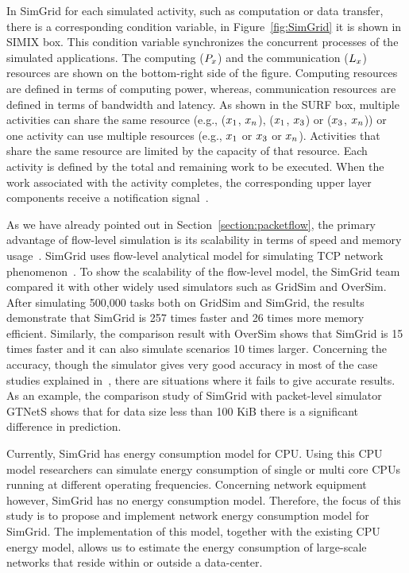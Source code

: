 In SimGrid for each simulated activity, such as computation or data transfer, there is a corresponding condition variable, in Figure~\ref{fig:SimGrid} it is shown in SIMIX box. This condition variable synchronizes the concurrent processes of the simulated applications. The computing (\($$P_{x}$$\)) and the communication (\($$L_{x}$$\)) resources are shown on the bottom-right side of the figure. Computing resources are defined in terms of computing power, whereas, communication resources are defined in terms of bandwidth and latency. As shown in the SURF box, multiple activities can share the same resource (e.g., (\($$x_{1}$$\), \($$x_{n}$$\)), (\($$x_{1}$$\), \($$x_{3}$$\)) or (\($$x_{3}$$\), \($$x_{n}$$\))) or one activity can use multiple resources (e.g., \($$x_{1}$$\) or \($$x_{3}$$\) or  \($$x_{n}$$\)). Activities that share the same resource are limited by the capacity of that resource. Each activity is defined by the total and remaining work to be executed. When the work associated with the activity completes, the corresponding upper layer components receive a notification signal~\cite{DBLP:journals/jpdc/CasanovaGLQS14}.

As we have already pointed out in Section~\ref{section:packetflow}, the primary advantage of flow-level simulation is its scalability in terms of speed and memory usage~\cite{DBLP:conf/ccgrid/QuinsonRT12}. SimGrid uses flow-level analytical model for simulating TCP network phenomenon~\cite{DBLP:journals/jpdc/CasanovaGLQS14}. To show the scalability of the flow-level model, the SimGrid team compared it with other widely used simulators such as GridSim and OverSim. After simulating 500,000 tasks both on GridSim and SimGrid, the results demonstrate that SimGrid is 257 times faster and 26 times more memory efficient. Similarly, the comparison result with OverSim shows that SimGrid is 15 times faster and it can also simulate scenarios 10 times larger. Concerning the accuracy, though the simulator gives very good accuracy in most of the case studies explained in~\cite{DBLP:journals/jpdc/CasanovaGLQS14}, there are situations where it fails to give accurate results. As an example, the comparison study of SimGrid with packet-level simulator GTNetS shows that for data size less than 100 KiB there is a significant difference in prediction. 

Currently, SimGrid has energy consumption model for CPU. Using this CPU model researchers can simulate energy consumption of single or multi core CPUs running at different operating frequencies. Concerning network equipment however, SimGrid has no energy consumption model. Therefore, the focus of this study is to propose and implement network energy consumption model for SimGrid. The implementation of this model, together with the existing CPU energy model, allows us to estimate the energy consumption of large-scale networks that reside within or outside a data-center.

